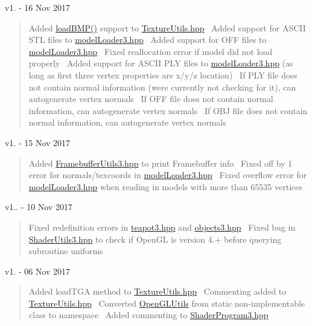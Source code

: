 v1. -\/ 16 Nov 2017 \begin{quote}
Added \hyperlink{_texture_utils_8hpp_a7f58e6db7faf86181d593d3afb1a55d7}{load\+B\+M\+P()} support to \hyperlink{_texture_utils_8hpp}{Texture\+Utils.\+hpp}~\newline
Added support for A\+S\+C\+II S\+TL files to \hyperlink{model_loader3_8hpp}{model\+Loader3.\+hpp}~\newline
Added support for O\+FF files to \hyperlink{model_loader3_8hpp}{model\+Loader3.\+hpp}~\newline
Fixed reallocation error if model did not load properly~\newline
Added support for A\+S\+C\+II P\+LY files to \hyperlink{model_loader3_8hpp}{model\+Loader3.\+hpp} (as long as first three vertex properties are x/y/z location)~\newline
If P\+LY file does not contain normal information (we\textquotesingle{}re currently not checking for it), can autogenerate vertex normals~\newline
If O\+FF file does not contain normal information, can autogenerate vertex normals~\newline
If O\+BJ file does not contain normal information, can autogenerate vertex normals \end{quote}


v1. -\/ 15 Nov 2017 \begin{quote}
Added \hyperlink{_framebuffer_utils3_8hpp}{Framebuffer\+Utils3.\+hpp} to print Framebuffer info~\newline
Fixed off by 1 error for normals/texcoords in \hyperlink{model_loader3_8hpp}{model\+Loader3.\+hpp}~\newline
Fixed overflow error for \hyperlink{model_loader3_8hpp}{model\+Loader3.\+hpp} when reading in models with more than 65535 vertices \end{quote}


v1.. -\/ 10 Nov 2017 \begin{quote}
Fixed redefinition errors in \hyperlink{teapot3_8hpp}{teapot3.\+hpp} and \hyperlink{objects3_8hpp}{objects3.\+hpp}~\newline
Fixed bug in \hyperlink{_shader_utils3_8hpp}{Shader\+Utils3.\+hpp} to check if Open\+GL is version 4.+ before querying subroutine uniforms \end{quote}


v1. -\/ 06 Nov 2017 \begin{quote}
Added load\+T\+GA method to \hyperlink{_texture_utils_8hpp}{Texture\+Utils.\+hpp}~\newline
Commenting added to \hyperlink{_texture_utils_8hpp}{Texture\+Utils.\+hpp}~\newline
Converted \hyperlink{namespace_open_g_l_utils}{Open\+G\+L\+Utils} from static non-\/implementable class to namespace~\newline
Added commenting to \hyperlink{_shader_program3_8hpp}{Shader\+Program3.\+hpp} \end{quote}


